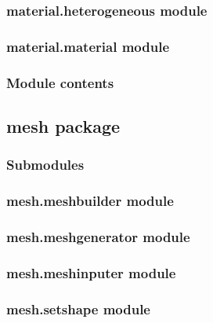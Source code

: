 \documentclass[letterpaper,10pt,english]{sphinxmanual}
\begin{document}
\subsubsection{material.heterogeneous module}
\label{\detokenize{material:material-heterogeneous-module}}

\subsubsection{material.material module}
\label{\detokenize{material:material-material-module}}

\subsubsection{Module contents}
\label{\detokenize{material:module-material}}\label{\detokenize{material:module-contents}}

\subsection{mesh package}
\label{\detokenize{mesh:mesh-package}}\label{\detokenize{mesh::doc}}

\subsubsection{Submodules}
\label{\detokenize{mesh:submodules}}

\subsubsection{mesh.meshbuilder module}
\label{\detokenize{mesh:mesh-meshbuilder-module}}

\subsubsection{mesh.meshgenerator module}
\label{\detokenize{mesh:mesh-meshgenerator-module}}

\subsubsection{mesh.meshinputer module}
\label{\detokenize{mesh:mesh-meshinputer-module}}

\subsubsection{mesh.setshape module}
\label{\detokenize{mesh:mesh-setshape-module}}
\end{document}
